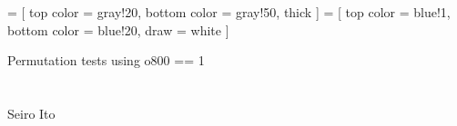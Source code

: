 

\renewcommand\Routcolor{\color{gray30}}
\newtheorem{finding}{Finding}[section]
\makeatletter
\g@addto@macro{\UrlBreaks}{\UrlOrds}
\newcommand\gobblepars{%
    \@ifnextchar\par%
        {\expandafter\gobblepars\@gobble}%
        {}}
\newenvironment{lightgrayleftbar}{%
  \def\FrameCommand{\textcolor{lightgray}{\vrule width 1zw} \hspace{10pt}}%
  \MakeFramed {\advance\hsize-\width \FrameRestore}}%
{\endMakeFramed}
\newenvironment{palepinkleftbar}{%
  \def\FrameCommand{\textcolor{palepink}{\vrule width 1zw} \hspace{10pt}}%
  \MakeFramed {\advance\hsize-\width \FrameRestore}}%
{\endMakeFramed}
\makeatother
\usepackage{caption}
\usepackage{setspace}
\usepackage{framed}
\def\pgfsysdriver{pgfsys-dvipdfm.def}
\usepackage{tikz}
\usetikzlibrary{calc, arrows, decorations, decorations.pathreplacing, backgrounds}
\usepackage{adjustbox}
 =
[
top color = gray!20, bottom color = gray!50, thick
]
 =
[
top color = blue!1, bottom color = blue!20, draw = white
]



\setlength{\baselineskip}{12pt}









\hfil Permutation tests using \textsf{o800} == 1\\

\hfil\MonthDY\\
\hfil{\footnotesize\currenttime}\\

\hfil Seiro Ito

\setcounter{tocdepth}{3}

